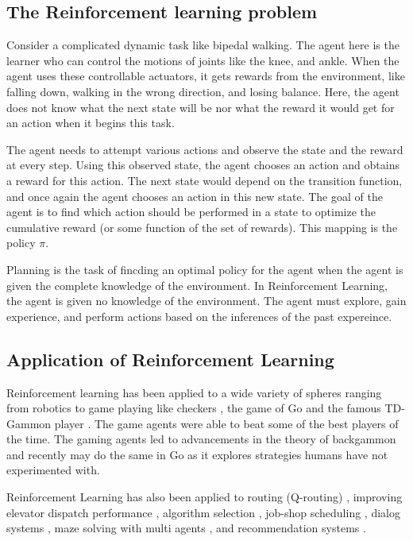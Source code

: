\documentclass[hidelinks,BTech]{iitmdiss}
\begin{document}
\subsection{The Reinforcement learning problem}
Consider a complicated dynamic task like bipedal walking. The agent here is the learner who can control the motions of joints like the knee, and ankle. When the agent uses these controllable actuators, it gets rewards from the environment, like falling down, walking in the wrong direction, and losing balance. Here, the agent does not know what the next state will be nor what the reward it would get for an action when it begins this task.

The agent needs to attempt various actions and observe the state and the reward at every step. Using this observed state, the agent chooses an action and obtains a reward for this action. The next state would depend on the transition function, and once again the agent chooses an action in this new state. The goal of the agent is to find which action should be performed in a state to optimize the cumulative reward (or some function of the set of rewards). This mapping is the policy $\pi$.


Planning is the task of fincding an optimal policy for the agent when the agent is given the complete knowledge of the environment. In Reinforcement Learning, the agent is given no knowledge of the environment. The agent must explore, gain experience, and perform actions based on the inferences of the past expereince.

\subsection{Application of Reinforcement Learning}
Reinforcement learning has been applied to a wide variety of spheres ranging from robotics \cite{HelicopterPegasus} to game playing like checkers \cite{RLInCheckers}, the game of Go \cite{RLInGo} and the famous TD-Gammon player \cite{RLInBackgammon}. The game agents were able to beat some of the best players of the time. The gaming agents led to advancements in the theory of backgammon and recently may do the same in Go as it explores strategies humans have not experimented with.

Reinforcement Learning has also been applied to routing (Q-routing) \cite{RLInQRouting},
improving elevator dispatch performance \cite{RLInElevators}, algorithm
selection \cite{RLInAlgoSelection}, job-shop scheduling \cite{RLInJobShopScheduling}, dialog systems \cite{RLInDialogSystems}, maze solving with multi agents \cite{PredatorPrey}, and recommendation systems \cite{RLInRecommenders}.
\end{document}
